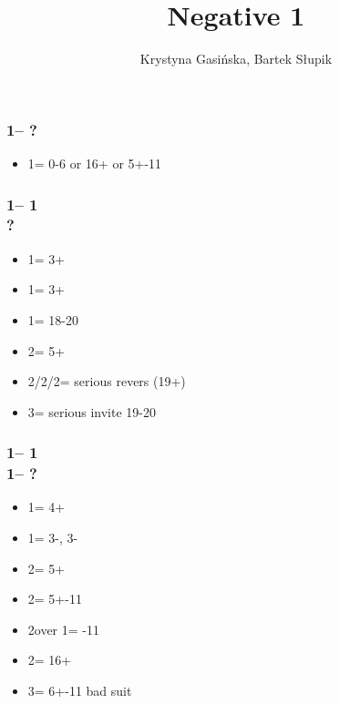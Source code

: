 \documentclass[12pt, a4paper]{article}
\title{Negative 1\diams}
\author{Krystyna Gasińska, Bartek Słupik}
\begin{document}
\maketitle


\subsubsection*{1\clubs -- ?}
\begin{itemize}
    \item 1\diams = 0-6 or 16+ \bal or 5+-11
\end{itemize}

\subsubsection*{1\clubs -- 1\diams\\
                ?}
\begin{itemize}
    \item 1\hearts = 3+
    \item 1\spades = 3+
    \item 1\nt = 18-20 \bal
    \item 2\clubs = 5+\clubs
    \item 2\diams/2\hearts/2\spades = serious revers (19+)
    \item 3\clubs = serious invite 19-20
\end{itemize}

\subsubsection*{1\clubs -- 1\diams\\
                1\major -- ?}
\begin{itemize}
    \item 1\spades = 4+\spades
    \item 1\nt = 3-\hearts, 3-\spades
    \item 2\clubs = 5+\clubs
    \item 2\diams = 5+-11
    \item 2\spades over 1\hearts = -11
    \item 2\nt = 16+ \bal
    \item 3\minor = 6+-11 bad suit
\end{itemize}



\end{document}
